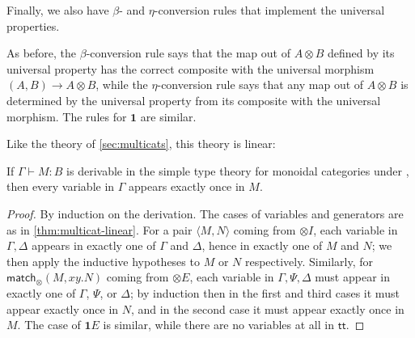 \documentclass{book}
\let\types\vdash
\def\ttt{\mathsf{tt}}
\def\pair#1#2{\langle #1,#2\rangle}
\def\match{\mathsf{match}}
\def\one{\mathbf{1}}
\let\tensor\otimes
\def\tensorI{\mathord{\tensor}I}
\def\tensorE{\mathord{\tensor}E}
\begin{document}
Finally, we also have $\beta$- and $\eta$-conversion rules that implement the universal properties.
As before, the $\beta$-conversion rule says that the map out of $A\tensor B$ defined by its universal property has the correct composite with the universal morphism $(A,B)\to A\tensor B$, while the $\eta$-conversion rule says that any map out of $A\tensor B$ is determined by the universal property from its composite with the universal morphism.
The rules for $\one$ are similar.

Like the theory of \cref{sec:multicats}, this theory is linear:

\begin{lem}\label{thm:moncat-linear}
  If $\Gamma\types M:B$ is derivable in the simple type theory for monoidal categories under \cG, then every variable in $\Gamma$ appears exactly once in $M$.
\end{lem}
\begin{proof}
  By induction on the derivation.
  The cases of variables and generators are as in \cref{thm:multicat-linear}.
  For a pair $\pair M N$ coming from $\tensorI$, each variable in $\Gamma,\Delta$ appears in exactly one of $\Gamma$ and $\Delta$, hence in exactly one of $M$ and $N$; we then apply the inductive hypotheses to $M$ or $N$ respectively.
  Similarly, for $\match_\tensor(M,xy.N)$ coming from $\tensorE$, each variable in $\Gamma,\Psi,\Delta$ must appear in exactly one of $\Gamma$, $\Psi$, or $\Delta$; by induction then in the first and third cases it must appear exactly once in $N$, and in the second case it must appear exactly once in $M$.
  The case of $\one E$ is similar, while there are no variables at all in $\ttt$.
\end{proof}
\end{document}
